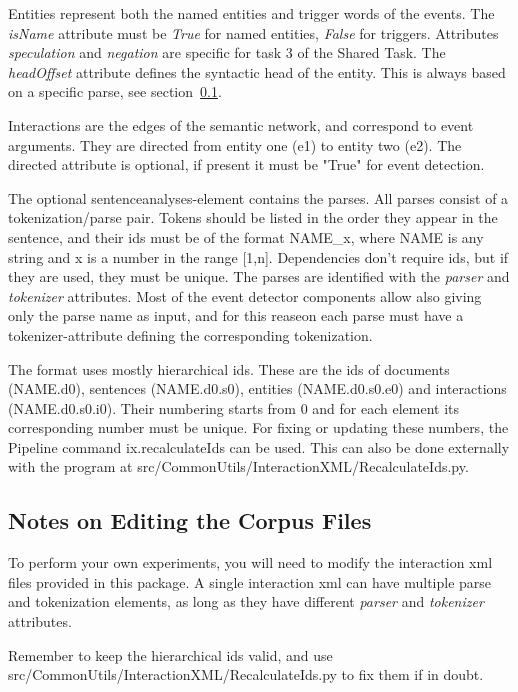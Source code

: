 \documentclass[a4paper,12pt]{article}
\begin{document}
Entities represent both the named entities and trigger words of the events. The
\emph{isName} attribute must be \emph{True} for named entities, \emph{False} for triggers.
Attributes \emph{speculation} and \emph{negation} are specific for task 3 of the Shared
Task. The \emph{headOffset} attribute defines the syntactic head of the entity. This
is always based on a specific parse, see section~\ref{sec-editing}.

Interactions are the edges of the semantic network, and correspond to event
arguments. They are directed from entity one (e1) to entity two (e2). The
directed attribute is optional, if present it must be "True" for event detection.

The optional sentenceanalyses-element contains the parses. All parses consist of
a tokenization/parse pair. Tokens should be listed in the order they appear in
the sentence, and their ids must be of the format NAME\_x, where NAME is any
string and x is a number in the range [1,n]. Dependencies don't require ids, but
if they are used, they must be unique. The parses are identified with the
\emph{parser} and \emph{tokenizer} attributes. Most of the event detector components
allow also giving only the parse name as input, and for this reaseon each parse must
have a tokenizer-attribute defining the corresponding tokenization.

The format uses mostly hierarchical ids. These are the ids of documents
(NAME.d0), sentences (NAME.d0.s0), entities (NAME.d0.s0.e0) and interactions
(NAME.d0.s0.i0). Their numbering starts from 0 and for each element its
corresponding number must be unique. For fixing or updating these numbers, the
Pipeline command ix.recalculateIds can be used. This can also be done
externally with the program at src/CommonUtils/InteractionXML/RecalculateIds.py.

\subsection{Notes on Editing the Corpus Files}
\label{sec-editing}

To perform your own experiments, you will need to modify the interaction xml
files provided in this package. A single interaction xml can have multiple parse
and tokenization elements, as long as they have different \emph{parser} and
\emph{tokenizer} attributes.

Remember to keep the hierarchical ids valid, and use
src/CommonUtils/InteractionXML/RecalculateIds.py to fix them if in doubt.
\end{document}
